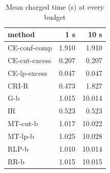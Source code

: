 \begin{table}[htbp]
\centering
\small
\caption{Mean charged time (s) at every budget}
\label{tab:E2b_head_to_head_budgets_time_by_budget}
\begin{tabular}{lrr}
\toprule
method & 1 s & 10 s \\
\midrule
CE-conf-comp & 1.910 & 1.910 \\
CE-cut-excess & 0.207 & 0.207 \\
CE-lp-excess & 0.047 & 0.047 \\
CRI-R & 0.473 & 1.827 \\
G-b & 1.015 & 10.014 \\
IR & 0.523 & 0.523 \\
MT-cut-b & 1.017 & 10.022 \\
MT-lp-b & 1.025 & 10.028 \\
RLP-b & 1.010 & 10.014 \\
RR-b & 1.015 & 10.015 \\
\bottomrule
\end{tabular}
\end{table}
